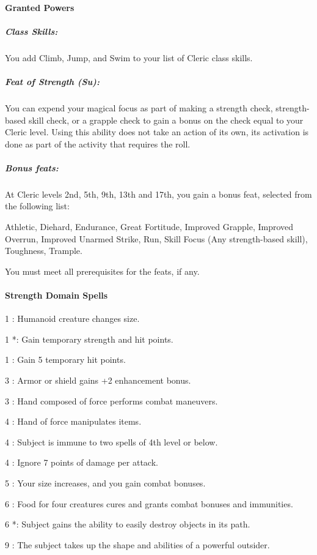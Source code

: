 \paragraph{Granted Powers}
\subparagraph{Class Skills:}
You add Climb, Jump, and Swim to your list of Cleric class skills.
\subparagraph{Feat of Strength (Su):}
You can expend your magical focus as part of making a strength check, strength-based skill check, or a grapple check to gain a bonus on the check equal to your Cleric level.
Using this ability does not take an action of its own, its activation is done as part of the activity that requires the roll.
\subparagraph{Bonus feats:}
At Cleric levels 2nd, 5th, 9th, 13th and 17th, you gain a bonus feat, selected from the following list:

Athletic, Diehard, Endurance, Great Fortitude, Improved Grapple, Improved Overrun, Improved Unarmed Strike, Run, Skill Focus (Any strength-based skill), Toughness, Trample.

You must meet all prerequisites for the feats, if any.
\paragraph{Strength Domain Spells}
\begin{list}{}{\leftmargin=1em}
\item[1] : Humanoid creature changes size.
\item[1] *: Gain temporary strength and hit points.
\item[1] : Gain 5 temporary hit points.
\item[3] : Armor or shield gains +2 enhancement bonus.
\item[3] : Hand composed of force performs combat maneuvers.
\item[4] : Hand of force manipulates items.
\item[4] : Subject is immune to two spells of 4th level or below.
\item[4] : Ignore 7 points of damage per attack.
\item[5] : Your size increases, and you gain combat bonuses.
\item[6] : Food for four creatures cures and grants combat bonuses and immunities.
\item[6] *: Subject gains the ability to easily destroy objects in its path.
\item[9] : The subject takes up the shape and abilities of a powerful outsider.
\end{list}
